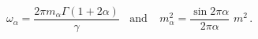 \begin{equation}\label{omega_alpha}
\omega_\alpha=\frac{2\pi m_\alpha\Gamma(1+2\alpha)}{\gamma}~~~~
\mbox{and}~~~~~m_\alpha^2 =\frac{\sin 2\pi\alpha}{2\pi\alpha}\,\,m^2\, . 
\end{equation}

